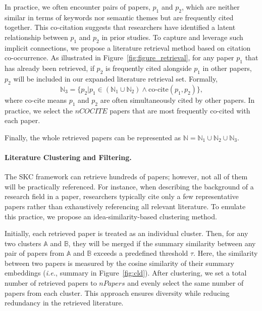 \documentclass{article}
\theoremstyle{plain}
\theoremstyle{definition}
\theoremstyle{remark}
\newcommand\ie{\textit{i.e.}}
\begin{document}
In practice, we often encounter pairs of papers, $p_1$ and $p_2$, which are neither similar in terms of keywords nor semantic themes but are frequently cited together. This co-citation suggests that researchers have identified a latent relationship between $p_1$ and $p_2$ in prior studies.
To capture and leverage such implicit connections, we propose a literature retrieval method based on citation co-occurrence. As illustrated in Figure~\ref{fig:figure_retrieval}, for any paper $p_1$ that has already been retrieved, if $p_2$ is frequently cited alongside $p_1$ in other papers, $p_2$ will be included in our expanded literature retrieval set. Formally,
\begin{equation}
    \mathbb{N}_3 = \{p_2 | p_1 \in (\mathbb{N}_1 \cup \mathbb{N}_2) \wedge \text{co-cite}(p_1, p_2) \},
\end{equation}
where co-cite means $p_1$ and $p_2$ are often simultaneously cited by other papers. In practice, we select the $nCOCITE$ papers that are most frequently co-cited with each paper.

Finally, the whole retrieved papers can be represented as $\mathbb{N} = \mathbb{N}_1 \cup \mathbb{N}_2 \cup \mathbb{N}_3$.

\paragraph{Literature Clustering and Filtering.} The SKC framework can retrieve hundreds of papers; however, not all of them will be practically referenced. For instance, when describing the background of a research field in a paper, researchers typically cite only a few representative papers rather than exhaustively referencing all relevant literature. To emulate this practice, we propose an idea-similarity-based clustering method.

Initially, each retrieved paper is treated as an individual cluster. Then, for any two clusters $\mathbb{A}$ and $\mathbb{B}$, they will be merged if the summary similarity between any pair of papers from $\mathbb{A}$ and $\mathbb{B}$ exceeds a predefined threshold $\tau$. Here, the similarity between two papers is measured by the cosine similarity of their summary embeddings (\ie, summary in Figure~\ref{fig:cld}).
After clustering, we set a total number of retrieved papers to $nPapers$ and evenly select the same number of papers from each cluster. This approach ensures diversity while reducing redundancy in the retrieved literature.
\end{document}
